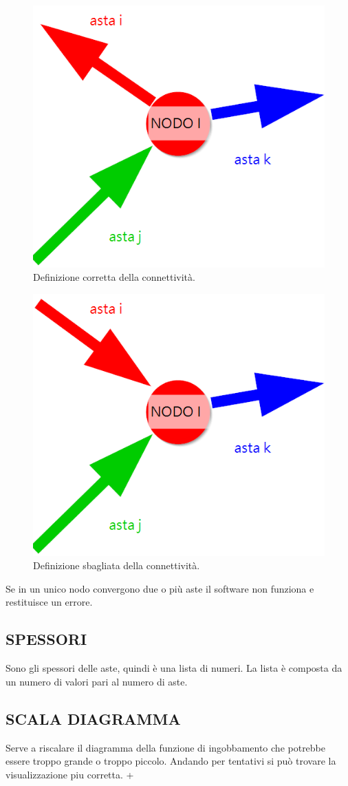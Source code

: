 \documentclass[12pt  , a4, titlepage]{article}
\begin{document}
			\begin{figure}[h!]
		\centering
		\includegraphics[width=0.5\linewidth]{FIGURE/CONNETTIVITA_GIUSTA}
		\caption{Definizione corretta della connettività.}
		\label{fig:CONNETTIVITA_GIUSTA}
	\end{figure}
\begin{figure}[h!]
	\centering
	\includegraphics[width=0.5\linewidth]{FIGURE/CONNETTIVITA_SBAGLIATA}
	\caption{Definizione sbagliata della connettività.}
	\label{fig:CONNETTIVITA_SBAGLIATA}
\end{figure}

	Se in un unico nodo convergono due o più aste il software non funziona e restituisce un errore.

\subsection*{SPESSORI}
Sono gli spessori delle aste, quindi è una lista di numeri. La lista è composta da un numero di valori pari al numero di aste. 
\subsection*{SCALA DIAGRAMMA}
Serve a riscalare il diagramma della funzione di ingobbamento che potrebbe essere troppo grande o troppo piccolo. Andando per tentativi si può trovare la visualizzazione piu corretta.
	\newpage+
\end{document}
